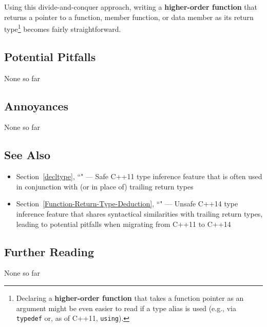 \noindent Using this divide-and-conquer approach, writing a \textbf{higher-order function} that returns a
pointer to a function, member function, or data member as its return
type{\cprotect\footnote{Declaring a \textbf{higher-order function} that
takes a function pointer as an argument might be even easier to read
if a type alias is used (e.g., via \texttt{typedef} or, as of C++11,
  \texttt{using}).}} becomes fairly straightforward.

\subsection[Potential Pitfalls]{Potential Pitfalls}\label{potential-pitfalls}

None so far

\subsection[Annoyances]{Annoyances}\label{annoyances}

None so far

\subsection[See Also]{See Also}\label{see-also}

\begin{itemize}
\item{Section~\ref{decltype}, ``" — Safe C++11 type inference feature that is often used in conjunction with (or in place of) trailing return types}
\item{Section~\ref{Function-Return-Type-Deduction}, ``" — Unsafe C++14 type inference feature that shares syntactical similarities with trailing return types, leading to potential pitfalls when migrating from C++11 to C++14}
\end{itemize}

\subsection[Further Reading]{Further Reading}\label{further-reading}

None so far


